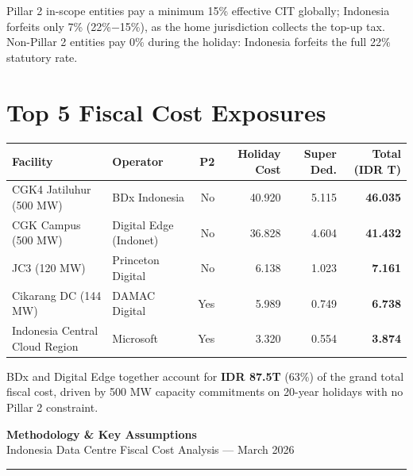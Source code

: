\documentclass[a4paper,10pt]{article}
\begin{document}
\vspace{4pt}
{\footnotesize\color{midgray}
  Pillar 2 in-scope entities pay a minimum 15\% effective CIT globally; Indonesia forfeits only 7\% (22\%$-$15\%), as the home jurisdiction collects the top-up tax.
  Non-Pillar 2 entities pay 0\% during the holiday: Indonesia forfeits the full 22\% statutory rate.
}

\vspace{8pt}

\section{Top 5 Fiscal Cost Exposures}

\begin{tabular}{llrrrr}
  \toprule
  \textbf{Facility} & \textbf{Operator} & \textbf{P2} & \textbf{Holiday Cost} & \textbf{Super Ded.} & \textbf{Total (IDR T)} \\
  \midrule
  CGK4 Jatiluhur (500 MW)       & BDx Indonesia         & No  & 40.920 & 5.115 & \textbf{46.035} \\
  CGK Campus (500 MW)           & Digital Edge (Indonet)& No  & 36.828 & 4.604 & \textbf{41.432} \\
  JC3 (120 MW)                  & Princeton Digital     & No  &  6.138 & 1.023 & \textbf{7.161}  \\
  Cikarang DC (144 MW)          & DAMAC Digital         & Yes &  5.989 & 0.749 & \textbf{6.738}  \\
  Indonesia Central Cloud Region & Microsoft            & Yes &  3.320 & 0.554 & \textbf{3.874}  \\
  \bottomrule
\end{tabular}

\vspace{4pt}
{\footnotesize\color{midgray}
  BDx and Digital Edge together account for \textbf{IDR 87.5T} (63\%) of the grand total fiscal cost,
  driven by 500 MW capacity commitments on 20-year holidays with no Pillar 2 constraint.
}

\clearpage


{\centering
  {\LARGE\bfseries\color{navy} Methodology \& Key Assumptions}\\[3pt]
  {\small\color{midgray} Indonesia Data Centre Fiscal Cost Analysis --- March 2026}\\[6pt]
}
\noindent\color{navy}\rule{\linewidth}{1.5pt}
\end{document}

